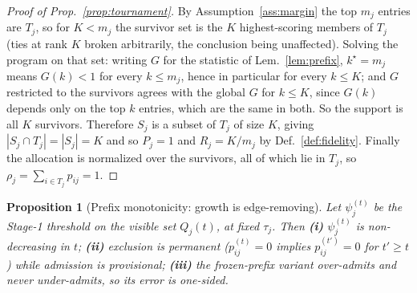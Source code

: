 \documentclass{article}
\newtheorem{proposition}{Proposition}
\begin{document}
\begin{proof}[Proof of Prop.~\ref{prop:tournament}]
By Assumption~\ref{ass:margin} the top $m_j$ entries are $T_j$, so for $K < m_j$ the survivor set
is the $K$ highest-scoring members of $T_j$ (ties at rank $K$ broken arbitrarily, the conclusion
being unaffected). Solving the program on that set: writing $G$ for
the statistic of Lem.~\ref{lem:prefix}, $k^\star = m_j$ means $G(k) < 1$ for every
$k \leq m_j$, hence in particular for every $k \leq K$; and $G$ restricted to the survivors
agrees with the global $G$ for $k \le K$, since $G(k)$ depends only on the top $k$ entries, which
are the same in both. So the support is all $K$ survivors.
Therefore $S_j$ is a subset of $T_j$ of size $K$, giving $|S_j \cap T_j| = |S_j| = K$ and so
$P_j = 1$ and $R_j = K/m_j$ by Def.~\ref{def:fidelity}. Finally the allocation is normalized over
the survivors, all of which lie in $T_j$, so $\rho_j = \sum_{i \in T_j} p_{ij} = 1$.
\end{proof}

\begin{proposition}[Prefix monotonicity: growth is edge-removing]
\label{prop:prefix}
Let $\psi_j^{(t)}$ be the Stage-1 threshold on the visible set $Q_j(t)$, at fixed $\tau_j$. Then
\textbf{(i)}
$\psi_j^{(t)}$ is non-decreasing in $t$; \textbf{(ii)} exclusion is permanent ($p_{ij}^{(t)}=0$
implies $p_{ij}^{(t')}=0$ for $t'\ge t$) while admission is provisional; \textbf{(iii)} the
frozen-prefix variant over-admits and never under-admits, so its error is one-sided.
\end{proposition}
\end{document}
